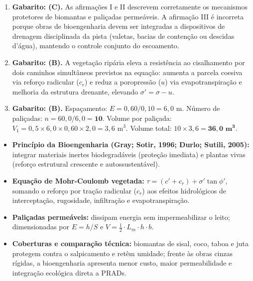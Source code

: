 \begin{boxGabarito}
\begin{enumerate}[leftmargin=1.6em, itemsep=4pt]
  \item \textbf{Gabarito: (C).} As afirmações I e II descrevem corretamente os mecanismos protetores de biomantas e paliçadas permeáveis. A afirmação III é incorreta porque obras de bioengenharia devem ser integradas a dispositivos de drenagem disciplinada da pista (valetas, bacias de contenção ou descidas d'água), mantendo o controle conjunto do escoamento.
  \item \textbf{Gabarito: (B).} A vegetação ripária eleva a resistência ao cisalhamento por dois caminhos simultâneos previstos na equação: aumenta a parcela coesiva via reforço radicular ($c_r$) e reduz a poropressão ($u$) via evapotranspiração e melhoria da estrutura drenante, elevando $\sigma' = \sigma - u$.
  \item \textbf{Gabarito: (B).} Espaçamento: $E = 0{,}60 / 0{,}10 = 6{,}0\text{ m}$. Número de paliçadas: $n = 60{,}0 / 6{,}0 = \mathbf{10}$. Volume por paliçada: $V_1 = 0{,}5 \times 6{,}0 \times 0{,}60 \times 2{,}0 = 3{,}6\text{ m}^3$. Volume total: $10 \times 3{,}6 = \mathbf{36{,}0\text{ m}^3}$.
\end{enumerate}
\end{boxGabarito}

\begin{boxResumo}
\begin{itemize}[leftmargin=1.4em, itemsep=2.5pt]
  \item \textbf{Princípio da Bioengenharia (Gray; Sotir, 1996; Durlo; Sutili, 2005):} integrar materiais inertes biodegradáveis (proteção imediata) e plantas vivas (reforço estrutural crescente e autossustentável).
  \item \textbf{Equação de Mohr-Coulomb vegetada:} $\tau = (c' + c_r) + \sigma'\tan\phi'$, somando o reforço por tração radicular ($c_r$) aos efeitos hidrológicos de interceptação, rugosidade, infiltração e evapotranspiração.
  \item \textbf{Paliçadas permeáveis:} dissipam energia sem impermeabilizar o leito; dimensionadas por $E = h/S$ e $V = \frac{1}{2}\cdot L_m \cdot h \cdot b$.
  \item \textbf{Coberturas e comparação técnica:} biomantas de sisal, coco, taboa e juta protegem contra o salpicamento e retêm umidade; frente às obras cinzas rígidas, a bioengenharia apresenta menor custo, maior permeabilidade e integração ecológica direta a PRADs.
\end{itemize}
\end{boxResumo}

